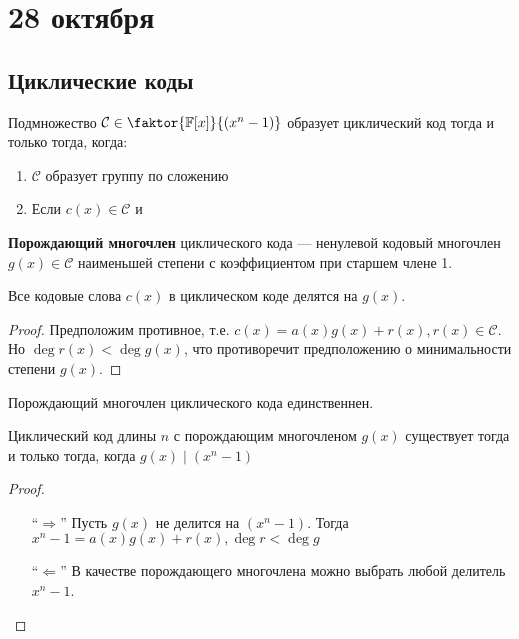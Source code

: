 \chapter{28 октября}

\section{Циклические коды}

\unfinished

\begin{theorem}
    Подмножество \(\mathcal{C} \in \faktor{\mathbb{F}[x]}{(x^n - 1)}\)
    образует циклический код тогда и только тогда, когда:
    \begin{enumerate}
        \item \(\mathcal{C}\) образует группу по сложению
        \item Если \(c(x) \in \mathcal{C}\) и \unfinished
    \end{enumerate}
\end{theorem}

\begin{definition}
    \textbf{Порождающий многочлен} циклического кода
    --- ненулевой кодовый многочлен \(g(x) \in \mathcal{C}\)
    наименьшей степени с коэффициентом при старшем члене 1.
\end{definition}

\begin{lemma}
    Все кодовые слова \(c(x)\) в циклическом коде делятся на \(g(x)\).
\end{lemma}
\begin{proof}
    Предположим противное, т.е. \(c(x) = a(x) g(x) + r(x), r(x) \in \mathcal{C}\).
    Но \(\deg r(x) < \deg g(x)\), что противоречит предположению о минимальности степени \(g(x)\).
\end{proof}

Порождающий многочлен циклического кода единственнен. %

\begin{lemma}
    Циклический код длины \(n\) с порождающим многочленом \(g(x)\)
    существует тогда и только тогда, когда \(g(x) \mid (x^n - 1)\)
\end{lemma}
\begin{proof}\itemfix
    \begin{itemize}
        \item [``\(\Rightarrow\)''] Пусть \(g(x)\) не делится на \((x^n - 1)\).
        Тогда \(x^n - 1 = a(x)g(x) + r(x), \deg r < \deg g\)
        \unfinished
        \item [``\(\Leftarrow\)'']  В качестве порождающего многочлена можно выбрать любой делитель \(x^n - 1\).
    \end{itemize}
\end{proof}

